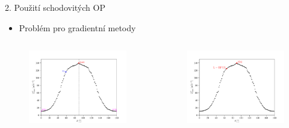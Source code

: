 \documentclass[aspectratio=169,xcolor=dvipsnames]{beamer}
\begin{document}
\begin{frame}[plain]{2. Použití schodovitých OP}
	\addtocounter{framenumber}{-1}
	\begin{itemize}
		\item Problém pro gradientní metody
	\end{itemize}
	\pause
	\vspace{-8mm}
	\begin{columns}
		\begin{column}{.5\textwidth}
			\begin{figure}
				\includegraphics[width=1.07\linewidth, trim={0 0 0cm 0mm}, clip]{Images/2left.pdf}
			\end{figure}
		\end{column}
		\begin{column}{.5\textwidth}
			\begin{figure}
				\includegraphics[width=1.07\linewidth, trim={0 0 0cm 0mm}, clip]{Images/2right.pdf}
			\end{figure}
		\end{column}
	\end{columns}
\end{frame}
\end{document}
